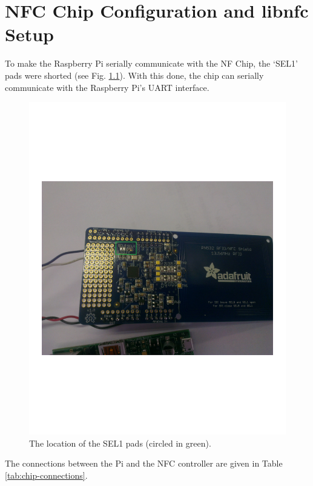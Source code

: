 \chapter{NFC Chip Configuration and libnfc Setup}
\label{app:nfc-chip-config}

To make the Raspberry Pi serially communicate with the NF Chip, the `SEL1'
pads were shorted (see Fig.
\ref{fig:nfc-chip-solder}). With this done, the chip can serially communicate
with the Raspberry Pi's UART interface.

\begin{figure}
 \centering 
 \includegraphics[clip=true, trim = 0 250 0 290,
 scale=0.1]{soldeer_pic}
 \caption[The location of the SEL1 pads.]{The location of the SEL1 pads (circled
 in green).}
 \label{fig:nfc-chip-solder}
\end{figure}

The connections between the Pi and the NFC controller are given in Table
\ref{tab:chip-connections}.

